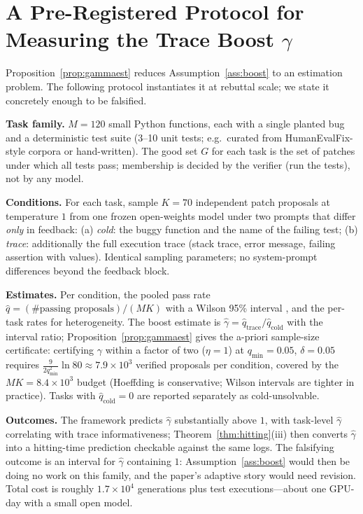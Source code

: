 \documentclass{article}
\theoremstyle{plain}
\theoremstyle{definition}
\theoremstyle{remark}
\begin{document}
\section{A Pre-Registered Protocol for Measuring the Trace Boost $\gamma$}
\label{app:protocol}

Proposition~\ref{prop:gammaest} reduces Assumption~\ref{ass:boost} to an estimation problem. The following protocol instantiates it at rebuttal scale; we state it concretely enough to be falsified.

\textbf{Task family.} $M = 120$ small Python functions, each with a single planted bug and a deterministic test suite (3--10 unit tests; e.g.\ curated from HumanEvalFix-style corpora or hand-written). The good set $G$ for each task is the set of patches under which all tests pass; membership is decided by the verifier (run the tests), not by any model.

\textbf{Conditions.} For each task, sample $K = 70$ independent patch proposals at temperature $1$ from one frozen open-weights model under two prompts that differ \emph{only} in feedback: (a) \emph{cold}: the buggy function and the name of the failing test; (b) \emph{trace}: additionally the full execution trace (stack trace, error message, failing assertion with values). Identical sampling parameters; no system-prompt differences beyond the feedback block.

\textbf{Estimates.} Per condition, the pooled pass rate $\hat q = (\#\text{passing proposals})/(MK)$ with a Wilson 95\% interval \citep{brown2001interval}, and the per-task rates for heterogeneity. The boost estimate is $\hat\gamma = \hat q_{\mathrm{trace}} / \hat q_{\mathrm{cold}}$ with the interval ratio; Proposition~\ref{prop:gammaest} gives the a-priori sample-size certificate: certifying $\gamma$ within a factor of two ($\eta = 1$) at $q_{\min} = 0.05$, $\delta = 0.05$ requires $\tfrac{9}{2 q_{\min}^2}\ln 80 \approx 7.9 \times 10^3$ verified proposals per condition, covered by the $MK = 8.4\times10^3$ budget (Hoeffding is conservative; Wilson intervals are tighter in practice). Tasks with $\hat q_{\mathrm{cold}} = 0$ are reported separately as cold-unsolvable.

\textbf{Outcomes.} The framework predicts $\hat\gamma$ substantially above $1$, with task-level $\hat\gamma$ correlating with trace informativeness; Theorem~\ref{thm:hitting}(iii) then converts $\hat\gamma$ into a hitting-time prediction checkable against the same logs. The falsifying outcome is an interval for $\hat\gamma$ containing $1$: Assumption~\ref{ass:boost} would then be doing no work on this family, and the paper's adaptive story would need revision. Total cost is roughly $1.7\times10^4$ generations plus test executions---about one GPU-day with a small open model.
\end{document}
